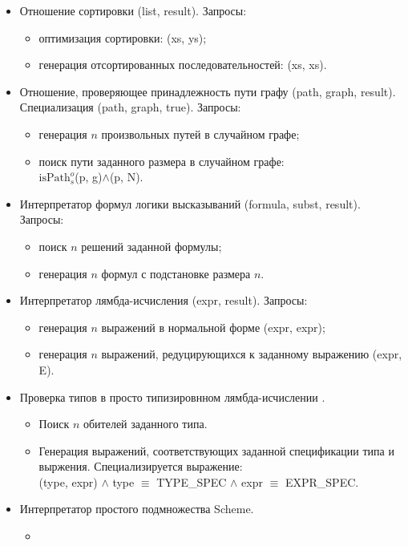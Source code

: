 
\begin{itemize}
\item Отношение сортировки (list, result). Запросы:
    \begin{itemize}
    \item оптимизация сортировки: (xs, ys);
    \item генерация отсортированных последовательностей: (xs, xs).
    \end{itemize}
\item Отношение, проверяющее принадлежность пути графу (path, graph, result).
      Специализация (path, graph, true). Запросы:
    \begin{itemize}
    \item генерация $n$ произвольных путей в случайном графе;
    \item поиск пути заданного размера в случайном графе: \\ $\text{isPath}^o_s$(p, g)$\land$(p, N).
    \end{itemize}
\item Интерпретатор формул логики высказываний (formula, subst, result). Запросы:
    \begin{itemize}
    \item поиск $n$ решений заданной формулы;
    \item генерация $n$ формул с подстановке размера $n$.
    \end{itemize}
\item Интерпретатор лямбда-исчисления (expr, result). Запросы:
	\begin{itemize}
	\item генерация $n$ выражений в нормальной форме (expr, expr);
	\item генерация $n$ выражений, редуцирующихся к заданному выражению (expr, E).
	\end{itemize}
\item Проверка типов в просто типизировнном лямбда-исчислении .
    \begin{itemize}
	\item Поиск $n$ обителей заданного типа.
	\item Генерация выражений, соответствующих заданной спецификации типа и выржения. Специализируется выражение:\\
	      (type, expr) $\land$ type $\equiv$ TYPE\_SPEC $\land$ expr $\equiv$ EXPR\_SPEC.
    \end{itemize}
\item Интерпретатор простого подмножества Scheme.
   \begin{itemize}
   \item {}
   \end{itemize}
\end{itemize}
